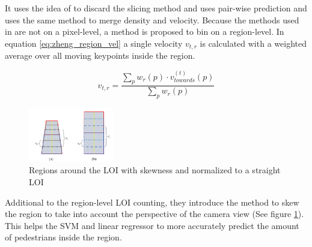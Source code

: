 It uses the idea of \cite{leibe_crossing-line_2016} to discard the slicing method and uses pair-wise prediction and uses the same method to merge density and velocity. Because the methods used in \cite{zheng_cross-line_2019} are not on a pixel-level, a method is proposed to bin on a region-level. In equation \ref{eq:zheng_region_vel} a single velocity $v_{t,r}$ is calculated with a weighted average over all moving keypoints inside the region.

\begin{equation}
	v_{t,r} = \frac{\sum_p w_r(p) \cdot v^{(t)}_{towards}(p)}{\sum_p w_r(p)}
	\label{eq:zheng_region_vel}
\end{equation}

\begin{figure}[h]
\centering
\includegraphics[width=0.33\textwidth]{images/zheng19_regions}
\caption{Regions around the LOI with skewness and normalized to a straight LOI}
\label{fig:zheng_skew}
\end{figure}

Additional to the region-level LOI counting, they introduce the method to skew the region to take into account the perspective of the camera view (See figure \ref{fig:zheng_skew}). This helps the SVM and linear regressor to more accurately predict the amount of pedestrians inside the region.

